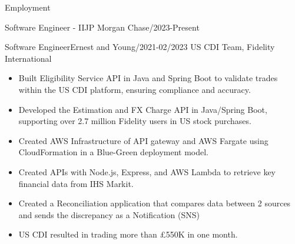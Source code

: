 \documentclass[]{mcdowellcv}
\begin{document}
\begin{cvsection}{Employment}
\begin{cvsubsection}{Software Engineer - II}{JP Morgan Chase}{/2023-Present}
\begin{itemize}
            \end{itemize}
        \end{cvsubsection}
        \begin{cvsubsection}{Software Engineer}{Ernest and Young}{/2021-02/2023}
            US CDI Team,    Fidelity International
            \begin{itemize}
                \item Built Eligibility Service API in Java and Spring Boot to validate trades within the US CDI platform, ensuring compliance and accuracy.
                \item Developed the Estimation and FX Charge API in Java/Spring Boot, supporting over 2.7 million Fidelity users in US stock purchases.
                \item Created AWS Infrastructure of API gateway and AWS Fargate using CloudFormation in a Blue-Green deployment model.
                \item Created APIs with Node.js, Express, and AWS Lambda to retrieve key financial data from IHS Markit.
                \item Created a Reconciliation application that compares data between 2 sources and sends the discrepancy as a
                Notification (SNS)
                \item US CDI resulted in trading more than £550K in one month.
            \end{itemize}
        \end{cvsubsection}
%

\end{cvsection}
\end{document}
